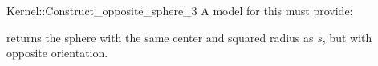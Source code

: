 \begin{ccRefFunctionObjectConcept}{Kernel::Construct_opposite_sphere_3}
A model for this must provide:


{ returns the sphere with the same center and squared radius as
  $s$, but with opposite orientation.}

\end{ccRefFunctionObjectConcept}
